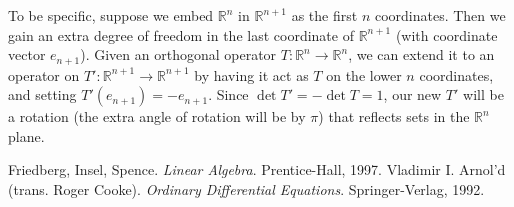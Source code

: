 \documentclass[12pt]{article}
\newcommand{\real}{\mathbb{R}}
\begin{document}
\begin{enumerate}[i.]
To be specific, suppose we embed $\real^n$ in $\real^{n+1}$ as the first $n$ coordinates.
Then we gain an extra degree of freedom in the last coordinate of $\real^{n+1}$
(with coordinate vector $e_{n+1}$).
Given an orthogonal operator $T\colon \real^n \to \real^n$,
we can extend it to an operator on $T'\colon \real^{n+1} \to \real^{n+1}$
by having it act as $T$ on the lower $n$ coordinates,
and setting $T'(e_{n+1}) = -e_{n+1}$.
Since $\det T' = -\det T = 1$,
our new $T'$ will be a rotation (the extra angle of rotation will be by $\pi$)
that reflects sets in the $\real^n$ plane.

\end{enumerate}

\begin{thebibliography}{3}
 Friedberg, Insel, Spence. {\it Linear Algebra}. Prentice-Hall, 1997.
 Vladimir I. Arnol'd (trans. Roger Cooke). {\it Ordinary Differential Equations}. Springer-Verlag, 1992.
\end{thebibliography}
\end{document}
